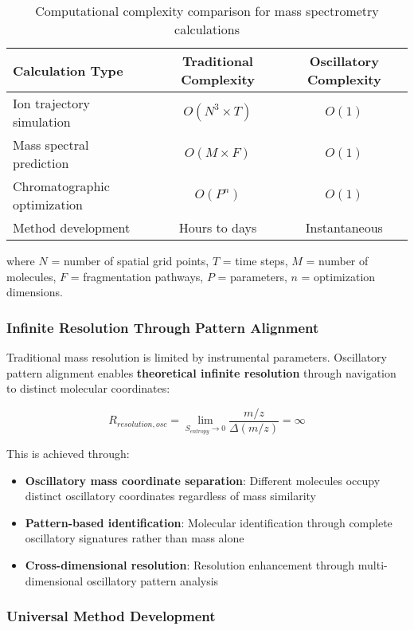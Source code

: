 \documentclass[11pt,a4paper]{article}
\theoremstyle{remark}
\begin{document}
\begin{table}[H]
\centering
\begin{tabular}{lcc}
\toprule
Calculation Type & Traditional Complexity & Oscillatory Complexity \\
\midrule
Ion trajectory simulation & $O(N^3 \times T)$ & $O(1)$ \\
Mass spectral prediction & $O(M \times F)$ & $O(1)$ \\
Chromatographic optimization & $O(P^n)$ & $O(1)$ \\
Method development & Hours to days & Instantaneous \\
\bottomrule
\end{tabular}
\caption{Computational complexity comparison for mass spectrometry calculations}
\end{table}

where $N$ = number of spatial grid points, $T$ = time steps, $M$ = number of molecules, $F$ = fragmentation pathways, $P$ = parameters, $n$ = optimization dimensions.

\subsubsection{Infinite Resolution Through Pattern Alignment}

Traditional mass resolution is limited by instrumental parameters. Oscillatory pattern alignment enables \textbf{theoretical infinite resolution} through navigation to distinct molecular coordinates:

$$R_{resolution,osc} = \lim_{S_{entropy} \rightarrow 0} \frac{m/z}{\Delta(m/z)} = \infty$$

This is achieved through:
\begin{itemize}
\item \textbf{Oscillatory mass coordinate separation}: Different molecules occupy distinct oscillatory coordinates regardless of mass similarity
\item \textbf{Pattern-based identification}: Molecular identification through complete oscillatory signatures rather than mass alone
\item \textbf{Cross-dimensional resolution}: Resolution enhancement through multi-dimensional oscillatory pattern analysis
\end{itemize}

\subsubsection{Universal Method Development}
\end{document}
